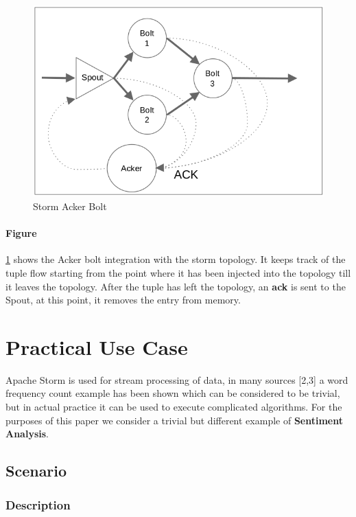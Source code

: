 \documentclass[runningheads,a4paper]{llncs}[2015/06/24]
\begin{document}
\begin{figure}
  \begin{center}
    \includegraphics[width=.7\textwidth]{acker.png}
    \caption{Storm Acker Bolt \cite{stormtwitter}}
    \label{fig:acker}
   \end{center}
\end{figure}

\paragraph{Figure} \ref{fig:acker} shows the Acker bolt integration with the storm topology. It keeps track of the tuple flow starting from the point where it has been injected into the topology till it leaves the topology. After the tuple has left the topology, an \textbf{ack} is sent to the Spout, at this point, it removes the entry from memory.

\section{Practical Use Case}
\label{sec:usecase}
Apache Storm is used for stream processing of data, in many sources [2,3] a word frequency count example has been shown which can be considered to be trivial, but in actual practice it can be used to execute complicated algorithms. For the purposes of this paper we consider a trivial but different example of \textbf{Sentiment Analysis}.

\subsection{Scenario}

\subsubsection{Description}
\end{document}
